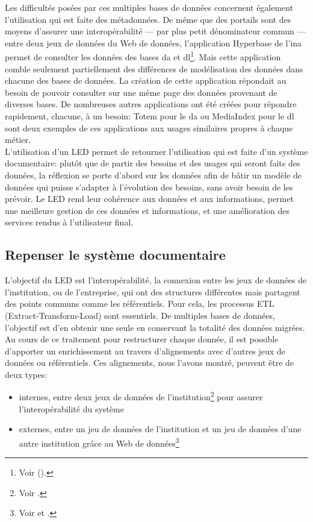 Les difficultés posées par ces multiples bases de données concernent également l'utilisation qui est faite des métadonnées. De même que des portails sont des moyens d'assurer une interopérabilité --- par plus petit dénominateur commun --- entre deux jeux de données du Web de données, l'application Hyperbase de l'\ac{ina} permet de consulter les données des bases \ac{da} et \ac{dl}\footnote{Voir  ().}. Mais cette application comble seulement partiellement des différences de modélisation des données dans chacune des bases de données. La création de cette application répondait au besoin de pouvoir consulter sur une même page des données provenant de diverses bases. De nombreuses autres applications ont été créées pour répondre rapidement, chacune, à un besoin: Totem pour le \ac{da} ou MediaIndex pour le \ac{dl} sont deux exemples de ces applications aux usages similaires propres à chaque métier.\\

L'utilisation d'un LED permet de retourner l'utilisation qui est faite d'un système documentaire: plutôt que de partir des besoins et des usages qui seront faits des données, la réflexion se porte d'abord sur les données afin de bâtir un modèle de données qui puisse s'adapter à l'évolution des besoins, sans avoir besoin de les prévoir.  Le LED rend leur cohérence aux données et aux informations, permet une meilleure gestion de ces données et informations, et une amélioration des services rendus à l'utilisateur final.

\subsection{\label{III-B-1-b}Repenser le système documentaire}

L'objectif du LED est l'interopérabilité, la connexion entre les jeux de données de l'institution, ou de l'entreprise, qui ont des structures différentes mais partagent des points communs comme les référentiels. Pour cela, les processus ETL (Extract-Transform-Load) sont essentiels. De multiples bases de données, l'objectif est d'en obtenir une seule en conservant la totalité des données migrées. Au cours de ce traitement pour restructurer chaque donnée, il est possible d'apporter un enrichissement au travers d'alignements avec d'autres jeux de données ou référentiels. Ces alignements, nous l'avons montré, peuvent être de deux types:
\begin{itemize}
	\item internes, entre deux jeux de données de l'institution\footnote{Voir .} pour assurer l'interopérabilité du système
	\item externes, entre un jeu de données de l'institution et un jeu de données d'une autre institution grâce au Web de données\footnote{Voir  et .}
\end{itemize}
\medskip

